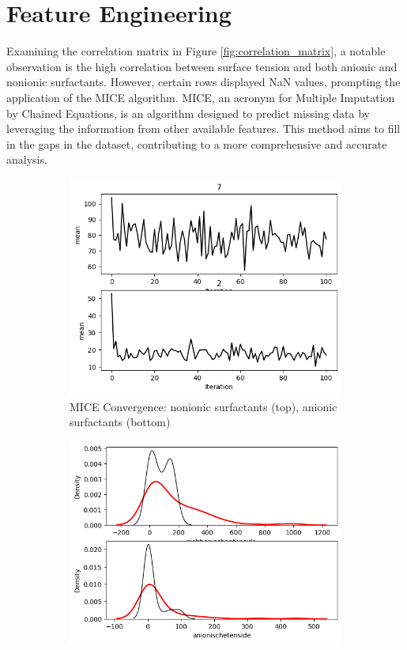 \documentclass{report}
\begin{document}
\section{Feature Engineering}
Examining the correlation matrix in Figure \ref{fig:correlation_matrix}, a notable observation is the high correlation between surface tension and both anionic and nonionic surfactants. However, certain rows displayed NaN values, prompting the application of the MICE algorithm. MICE, an acronym for Multiple Imputation by Chained Equations, is an algorithm designed to predict missing data by leveraging the information from other available features. This method aims to fill in the gaps in the dataset, contributing to a more comprehensive and accurate analysis.
\begin{figure}[H]
    \begin{subfigure}[t]{0.48\textwidth}
        \centering
        \includegraphics[width=\linewidth]{MICE_convergence.png}
        \caption{MICE Convergence: nonionic surfactants (top), anionic surfactants (bottom)}
        \label{fig:MICE_convergence}
    \end{subfigure}
    \hfill
    \begin{subfigure}[t]{0.48\textwidth}
        \centering
        \includegraphics[width=\linewidth]{MICE_distributions.png}

\end{subfigure}
\end{figure}
\end{document}
